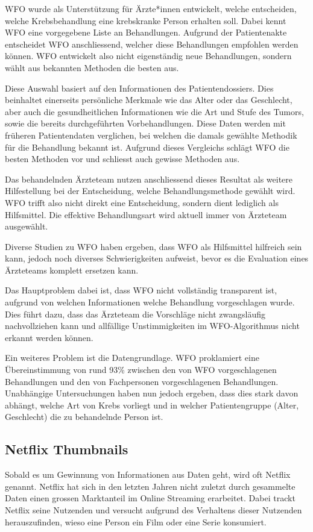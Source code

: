 WFO wurde als Unterstützung für Ärzte*innen entwickelt, welche entscheiden, welche Krebsbehandlung eine krebskranke Person erhalten soll. Dabei kennt WFO eine vorgegebene Liste an Behandlungen. Aufgrund der Patientenakte entscheidet WFO anschliessend, welcher diese Behandlungen empfohlen werden können. WFO entwickelt also nicht eigenständig neue Behandlungen, sondern wählt aus bekannten Methoden die besten aus.

Diese Auswahl basiert auf den Informationen des Patientendossiers. Dies beinhaltet einerseits persönliche Merkmale wie das Alter oder das Geschlecht, aber auch die gesundheitlichen Informationen wie die Art und Stufe des Tumors, sowie die bereits durchgeführten Vorbehandlungen.
Diese Daten werden mit früheren Patientendaten verglichen, bei welchen die damals gewählte Methodik für die Behandlung bekannt ist. Aufgrund dieses Vergleichs schlägt WFO die besten Methoden vor und schliesst auch gewisse Methoden aus.

Das behandelnden Ärzteteam nutzen anschliessend dieses Resultat als weitere Hilfestellung bei der Entscheidung, welche Behandlungsmethode gewählt wird.
WFO trifft also nicht direkt eine Entscheidung, sondern dient lediglich als Hilfsmittel. Die effektive Behandlungsart wird aktuell immer von Ärzteteam ausgewählt.

Diverse Studien zu WFO haben ergeben, dass WFO als Hilfsmittel hilfreich sein kann, jedoch noch diverses Schwierigkeiten aufweist, bevor es die Evaluation eines Ärzteteams komplett ersetzen kann.

Das Hauptproblem dabei ist, dass WFO nicht vollständig transparent ist, aufgrund von welchen Informationen welche Behandlung vorgeschlagen wurde. 
Dies führt dazu, dass das Ärzteteam die Vorschläge nicht zwangsläufig nachvollziehen kann und allfällige Unstimmigkeiten im WFO-Algorithmus nicht erkannt werden können.

Ein weiteres Problem ist die Datengrundlage. WFO proklamiert eine Übereinstimmung von rund 93\% zwischen den von WFO vorgeschlagenen Behandlungen und den von Fachpersonen vorgeschlagenen Behandlungen.
Unabhängige Untersuchungen haben nun jedoch ergeben, dass dies stark davon abhängt, welche Art von Krebs vorliegt und in welcher Patientengruppe (Alter, Geschlecht) die zu behandelnde Person ist. \cite{wfo1} \cite{wfo2} \cite{wfo3}


\subsection{Netflix Thumbnails}
Sobald es um Gewinnung von Informationen aus Daten geht, wird oft Netflix genannt. Netflix hat sich in den letzten Jahren nicht zuletzt durch gesammelte Daten einen grossen Marktanteil im Online Streaming erarbeitet.
Dabei trackt Netflix seine Nutzenden und versucht aufgrund des Verhaltens dieser Nutzenden herauszufinden, wieso eine Person ein Film oder eine Serie konsumiert.\cite{netflix}

